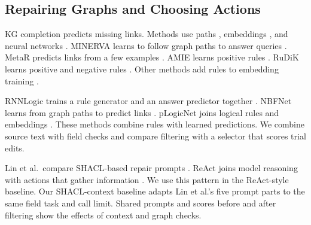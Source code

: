 \subsection{Repairing Graphs and Choosing Actions}

KG completion predicts missing links. Methods use paths
\citep{ref_lao2011}, embeddings
\citep{ref_bordes2013,ref_yang2015,ref_shi2017}, and neural networks
\citep{ref_dettmers2018}. MINERVA learns to follow graph paths to answer
queries \citep{ref_das2018}. MetaR predicts links from a few examples
\citep{ref_chen2019}. AMIE learns positive rules \citep{ref_galarraga2013}.
RuDiK learns positive and negative rules \citep{ref_ortona2018}.
Other methods add rules to embedding training
\citep{ref_guo2016,ref_ding2018}.

RNNLogic trains a rule generator and an answer predictor together
\citep{ref_qu2021}. NBFNet learns from graph paths to predict links
\citep{ref_zhu2021}. pLogicNet joins logical rules and embeddings
\citep{ref_qu2019}. These methods combine rules with learned predictions.
We combine source text with field checks and compare filtering with a
selector that scores trial edits.

Lin et al.\ compare SHACL-based repair prompts \citep{ref_lin2025}.
ReAct joins model reasoning with actions that gather information
\citep{ref_yao2023react}. We use this pattern in the ReAct-style baseline.
Our SHACL-context baseline adapts Lin et al.'s five prompt parts to the same
field task and call limit. Shared prompts and scores before and after
filtering show the effects of context and graph checks.
